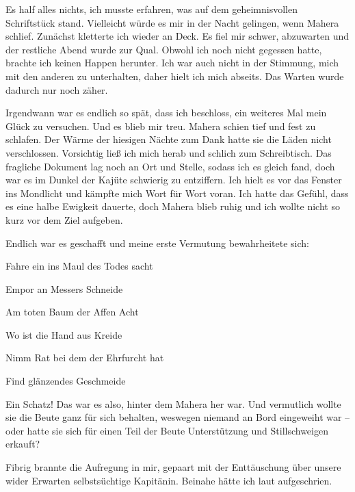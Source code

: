 Es half alles nichts, ich musste erfahren, was auf dem geheimnisvollen Schriftstück stand. Vielleicht würde es mir in der Nacht gelingen, wenn Mahera schlief. Zunächst kletterte ich wieder an Deck. Es fiel mir schwer, abzuwarten und der restliche Abend wurde zur Qual. Obwohl ich noch nicht gegessen hatte, brachte ich keinen Happen herunter. Ich war auch nicht in der Stimmung, mich mit den anderen zu unterhalten, daher hielt ich mich abseits. Das Warten wurde dadurch nur noch zäher.

Irgendwann war es endlich so spät, dass ich beschloss, ein weiteres Mal mein Glück zu versuchen. Und es blieb mir treu. Mahera schien tief und fest zu schlafen. Der Wärme der hiesigen Nächte zum Dank hatte sie die Läden nicht verschlossen. Vorsichtig ließ ich mich herab und schlich zum Schreibtisch. Das fragliche Dokument lag noch an Ort und Stelle, sodass ich es gleich fand, doch war es im Dunkel der Kajüte schwierig zu entziffern. Ich hielt es vor das Fenster ins Mondlicht und kämpfte mich Wort für Wort voran. Ich hatte das Gefühl, dass es eine halbe Ewigkeit dauerte, doch Mahera blieb ruhig und ich wollte nicht so kurz vor dem Ziel aufgeben.

Endlich war es geschafft und meine erste Vermutung bewahrheitete sich:

\vspace{0.5cm}\noindent
\begin{itshape}Fahre ein ins Maul des Todes sacht

Empor an Messers Schneide

\vspace{0.5cm}\noindent
Am toten Baum der Affen Acht

Wo ist die Hand aus Kreide

\vspace{0.5cm}\noindent
Nimm Rat bei dem der Ehrfurcht hat

Find glänzendes Geschmeide\end{itshape}

\vspace{0.5cm}\noindent
Ein Schatz! Das war es also, hinter dem Mahera her war. Und vermutlich wollte sie die Beute ganz für sich behalten, weswegen niemand an Bord eingeweiht war -- oder hatte sie sich für einen Teil der Beute Unterstützung und Stillschweigen erkauft?

Fibrig brannte die Aufregung in mir, gepaart mit der Enttäuschung über unsere wider Erwarten selbstsüchtige Kapitänin. Beinahe hätte ich laut aufgeschrien.

